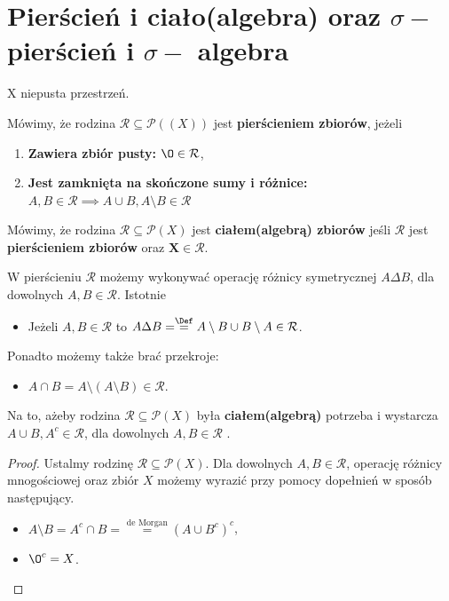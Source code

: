 \section{Pierścień i  ciało(algebra) oraz $\sigma-$ pierścień i $\sigma-$ algebra}
\begin{context}
	X niepusta przestrzeń.
\end{context}

\begin{definition}
	
	Mówimy, że rodzina $\mathcal{R}\subseteq \mathcal{P}(\left( X \right) ) $ jest \textbf{pierścieniem zbiorów}, jeżeli
	\begin{enumerate}[label=\alph*)]
		\item \textbf{Zawiera zbiór pusty:} $\O\in \mathcal{R}$,
		\item \textbf{Jest zamknięta na skończone sumy i różnice:}  $A,B \in \mathcal{R} \implies A\cup B, A\setminus B \in \mathcal{R}$
	\end{enumerate}

	Mówimy, że rodzina $\mathcal{R}\subseteq \mathcal{P}(X) $ jest \textbf{ciałem(algebrą) zbiorów} jeśli $\mathcal{R}$ jest  \textbf{pierścieniem zbiorów} oraz $\bm{X \in \mathcal{R}}$. 
\end{definition}
W pierścieniu $\mathcal{R}$ możemy wykonywać operację różnicy symetrycznej $A\Delta  B$, dla dowolnych  $A,B \in \mathcal{R}$. Istotnie
\begin{itemize}
	\item Jeżeli $A,B \in \mathcal{R}$ to $A\Delta B = \overset{\Def}{=} A\setminus B \cup B\setminus A \in \mathcal{R}$.
\end{itemize}
Ponadto możemy także brać przekroje:
 \begin{itemize}
	\item $A\cap B = A \setminus \left( A\setminus B \right) \in \mathcal{R}$.
\end{itemize}
\begin{remark}
	Na to, ażeby rodzina $\mathcal{R}\subseteq \mathcal{P}(X) $ była \textbf{ciałem(algebrą) } potrzeba i wystarcza $A\cup B, A^{c} \in \mathcal{R}$, dla dowolnych $A,B \in \mathcal{R}$ .
\end{remark} 
\begin{proof}
	Ustalmy rodzinę $\mathcal{R} \subseteq \mathcal{P}(X)$. Dla dowolnych $A,B \in \mathcal{R}$, operację różnicy mnogościowej oraz zbiór $X$ możemy wyrazić przy pomocy dopełnień w sposób następujący.
	\begin{itemize}
		\item $A\setminus B = A^{c}\cap B = \overset{\text{de Morgan}}{=} \left( A \cup B^{c} \right) ^{c}$,
	        \item $\O^{c} = X$.
	\end{itemize}
\end{proof} 

